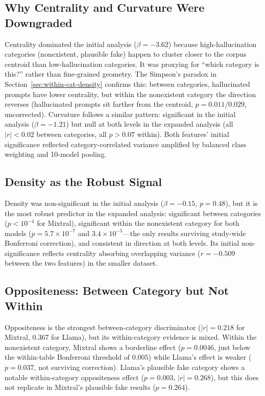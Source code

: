 \subsection{Why Centrality and Curvature Were Downgraded}
\label{sec:centrality-curvature}

Centrality dominated the initial analysis ($\beta = -3.62$) because high-hallucination categories (nonexistent, plausible fake) happen to cluster closer to the corpus centroid than low-hallucination categories. It was proxying for ``which category is this?'' rather than fine-grained geometry. The Simpson's paradox in Section~\ref{sec:within-cat-density} confirms this: between categories, hallucinated prompts have lower centrality, but within the nonexistent category the direction reverses (hallucinated prompts sit farther from the centroid, $p = 0.011$/$0.029$, uncorrected). Curvature follows a similar pattern: significant in the initial analysis ($\beta = -1.21$) but null at both levels in the expanded analysis (all $|r| < 0.02$ between categories, all $p > 0.07$ within). Both features' initial significance reflected category-correlated variance amplified by balanced class weighting and 10-model pooling.

\subsection{Density as the Robust Signal}
\label{sec:density-robust}

Density was non-significant in the initial analysis ($\beta = -0.15$, $p = 0.48$), but it is the most robust predictor in the expanded analysis: significant between categories ($p < 10^{-4}$ for Mixtral), significant within the nonexistent category for both models ($p = 5.7 \times 10^{-7}$ and $3.4 \times 10^{-5}$---the only results surviving study-wide Bonferroni correction), and consistent in direction at both levels. Its initial non-significance reflects centrality absorbing overlapping variance ($r = -0.509$ between the two features) in the smaller dataset.
\subsection{Oppositeness: Between Category but Not Within}
\label{sec:oppositeness-assessment}

Oppositeness is the strongest between-category discriminator ($|r| = 0.218$ for Mixtral, $0.367$ for Llama), but its within-category evidence is mixed. Within the nonexistent category, Mixtral shows a borderline effect ($p = 0.0046$, just below the within-table Bonferroni threshold of $0.005$) while Llama's effect is weaker ($p = 0.037$, not surviving correction). Llama's plausible fake category shows a notable within-category oppositeness effect ($p = 0.003$, $|r| = 0.268$), but this does not replicate in Mixtral's plausible fake results ($p = 0.264$).

